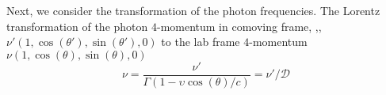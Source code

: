 Next, we consider the transformation of the photon frequencies. 
%
The Lorentz transformation of the photon $4$-momentum in comoving frame, \eg,, 
$\nu'(1, \cos(\theta'), \sin(\theta'),0)$ to the lab frame $4$-momentum 
$\nu(1, \cos(\theta), \sin(\theta), 0)$
%
%
\begin{equation}
\nu = \frac{\nu'}{\Gamma (1 - \upsilon\cos(\theta)/c)} = \nu' / \mathcal{D}
\label{eq:afterglow:dop_fac_freq}
\end{equation}
%




%

